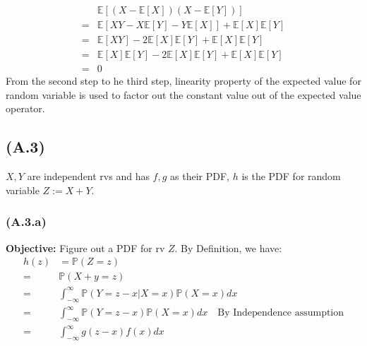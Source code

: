 \documentclass[]{article}
\begin{document}
            

            \begin{align*}\tag{1.2.b.2}\label{eqn:1.2.b.2}
                &\mathbb{E}\left[( X- \mathbb{E}\left[X\right])
                    (X - \mathbb{E}\left[Y\right])
                \right]
                \\
                =&
                \mathbb{E}\left[XY - 
                    X \mathbb{E}\left[Y\right]
                    -Y \mathbb{E}\left[X\right]
                \right]
                +
                \mathbb{E}\left[X\right]\mathbb{E}\left[Y\right]
                \\
                =&
                \mathbb{E}\left[XY\right] - 2 \mathbb{E}\left[X\right]\mathbb{E}\left[Y\right]
                + 
                \mathbb{E}\left[X\right]\mathbb{E}\left[Y\right]
                \\
                =&
                \mathbb{E}\left[X\right]\mathbb{E}\left[Y\right] - 2 \mathbb{E}\left[X\right]\mathbb{E}\left[Y\right]
                + 
                \mathbb{E}\left[X\right]\mathbb{E}\left[Y\right]
                \\
                =& 0
            \end{align*}
            From the second step to he third step, linearity property of the expected value for random variable is used to factor out the constant value out of the expected value operator. 
    \subsection*{(A.3)}
        $X, Y$ are independent rvs and has $f,g$ as their PDF, $h$ is the PDF for random variable $Z:= X + Y$. 
        \subsubsection*{(A.3.a)}
            \textbf{Objective: } Figure out a PDF for rv $Z$. By Definition, we have: 
            \begin{align*}\tag{1.3.a.1}\label{eqn:1.3.a.1}
                h(z) &= \mathbb{P}\left(Z = z\right)
                \\
                =& 
                \mathbb{P}\left(X + y = z\right)
                \\
                =&
                \int_{-\infty}^{\infty} 
                    \mathbb{P}\left(Y = z - x|X = x\right)
                    \mathbb{P}\left(X = x\right) 
                dx
                \\
                =& 
                \int_{-\infty}^{\infty} 
                    \mathbb{P}\left(Y = z - x\right)
                    \mathbb{P}\left(X = x\right) 
                dx \quad \text{By Independence assumption}
                \\
                =& 
                \int_{-\infty}^{\infty} g(z - x)f(x)dx
            \end{align*}
\end{document}

